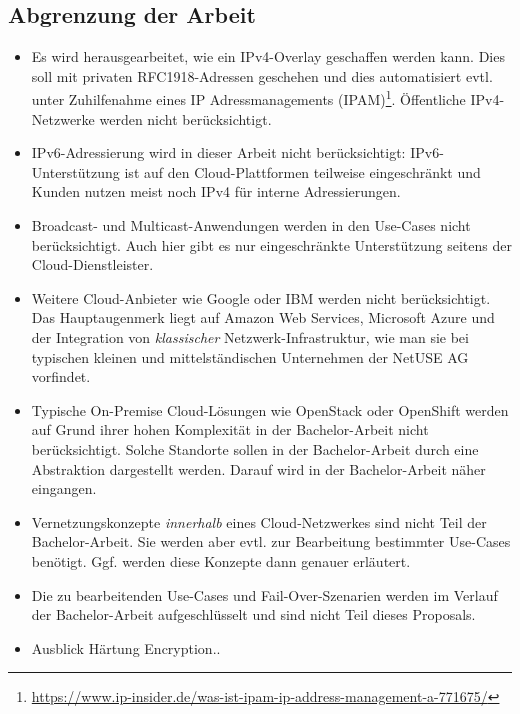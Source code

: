 \subsection{Abgrenzung der Arbeit}

\begin{itemize}
\item Es wird herausgearbeitet, wie ein IPv4-Overlay geschaffen werden kann. Dies soll mit privaten RFC1918-Adressen geschehen und dies automatisiert evtl. unter Zuhilfenahme eines IP Adressmanagements (IPAM)\footnote{\url{https://www.ip-insider.de/was-ist-ipam-ip-address-management-a-771675/}}. Öffentliche IPv4-Netzwerke werden nicht berücksichtigt.
\item IPv6-Adressierung wird in dieser Arbeit nicht berücksichtigt: IPv6-Unterstützung ist auf den Cloud-Plattformen teilweise eingeschränkt und Kunden nutzen meist noch IPv4 für interne Adressierungen.
\item Broadcast- und Multicast-Anwendungen werden in den Use-Cases nicht berücksichtigt. Auch hier gibt es nur eingeschränkte Unterstützung seitens der Cloud-Dienstleister.
\item Weitere Cloud-Anbieter wie Google oder IBM werden nicht berücksichtigt. Das Hauptaugenmerk liegt auf Amazon Web Services, Microsoft Azure und der Integration von \textit{klassischer} Netzwerk-Infrastruktur, wie man sie bei typischen kleinen und mittelständischen Unternehmen der NetUSE AG vorfindet.
\item Typische On-Premise Cloud-Lösungen wie OpenStack oder OpenShift werden auf Grund ihrer hohen Komplexität in der Bachelor-Arbeit nicht berücksichtigt. Solche Standorte sollen in der Bachelor-Arbeit durch eine Abstraktion dargestellt werden. Darauf wird in der Bachelor-Arbeit näher eingangen.
\item Vernetzungskonzepte \textit{innerhalb} eines Cloud-Netzwerkes sind nicht Teil der Bachelor-Arbeit. Sie werden aber evtl. zur Bearbeitung bestimmter Use-Cases benötigt. Ggf. werden diese Konzepte dann genauer erläutert.
\item Die zu bearbeitenden Use-Cases und Fail-Over-Szenarien werden im Verlauf der Bachelor-Arbeit aufgeschlüsselt und sind nicht Teil dieses Proposals.
\item Ausblick Härtung Encryption..

\end{itemize}
